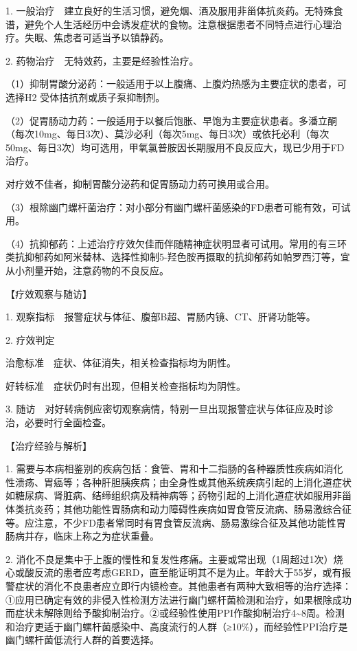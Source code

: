 1.
一般治疗　建立良好的生活习惯，避免烟、酒及服用非甾体抗炎药。无特殊食谱，避免个人生活经历中会诱发症状的食物。注意根据患者不同特点进行心理治疗。失眠、焦虑者可适当予以镇静药。

2. 药物治疗　无特效药，主要是经验性治疗。

（1）抑制胃酸分泌药：一般适用于以上腹痛、上腹灼热感为主要症状的患者，可选择H{2}
受体拮抗剂或质子泵抑制剂。

（2）促胃肠动力药：一般适用于以餐后饱胀、早饱为主要症状患者。多潘立酮（每次10mg、每日3次）、莫沙必利（每次5mg、每日3次）或依托必利（每次50mg、每日3次）均可选用，甲氧氯普胺因长期服用不良反应大，现已少用于FD治疗。

对疗效不佳者，抑制胃酸分泌药和促胃肠动力药可换用或合用。

（3）根除幽门螺杆菌治疗：对小部分有幽门螺杆菌感染的FD患者可能有效，可试用。

（4）抗抑郁药：上述治疗疗效欠佳而伴随精神症状明显者可试用。常用的有三环类抗抑郁药如阿米替林、选择性抑制5-羟色胺再摄取的抗抑郁药如帕罗西汀等，宜从小剂量开始，注意药物的不良反应。

【疗效观察与随访】

1. 观察指标　报警症状与体征、腹部B超、胃肠内镜、CT、肝肾功能等。

2. 疗效判定

治愈标准　症状、体征消失，相关检查指标均为阴性。

好转标准　症状仍时有出现，但相关检查指标均为阴性。

3.
随访　对好转病例应密切观察病情，特别一旦出现报警症状与体征应及时诊治，必要时行全面检查。

【治疗经验与解析】

1.
需要与本病相鉴别的疾病包括：食管、胃和十二指肠的各种器质性疾病如消化性溃疡、胃癌等；各种肝胆胰疾病；由全身性或其他系统疾病引起的上消化道症状如糖尿病、肾脏病、结缔组织病及精神病等；药物引起的上消化道症状如服用非甾体类抗炎药；其他功能性胃肠病和动力障碍性疾病如胃食管反流病、肠易激综合征等。应注意，不少FD患者常同时有胃食管反流病、肠易激综合征及其他功能性胃肠病并存，临床上称之为症状重叠。

2.
消化不良是集中于上腹的慢性和复发性疼痛。主要或常出现（1周超过1次）烧心或酸反流的患者应考虑GERD，直至能证明其不是为止。年龄大于55岁，或有报警症状的消化不良患者应立即行内镜检查。其他患者有两种大致相等的治疗选择：①应用已确定有效的非侵入性检测方法进行幽门螺杆菌检测和治疗，如果根除成功而症状未解除则给予酸抑制治疗。②或经验性使用PPI作酸抑制治疗4\textasciitilde{}8周。检测和治疗更适于幽门螺杆菌感染中、高度流行的人群（≥10\%），而经验性PPI治疗是幽门螺杆菌低流行人群的首要选择。

